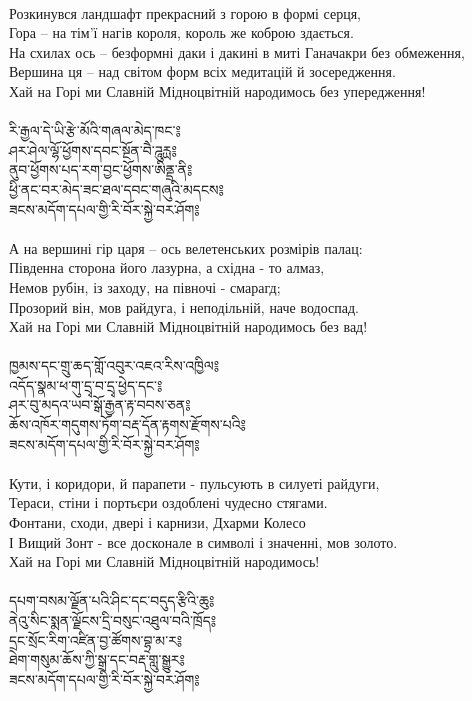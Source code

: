 \\
Розкинувся ландшафт прекрасний з горою в формі серця,\\
Гора -- на тім'ї нагів короля, король же коброю здається.\\
На схилах ось -- безформні даки і дакині в миті Ганачакри без обмеження, \\
Вершина ця -- над світом форм всіх медитацій й зосередження.\\
Хай на Горі ми Славній Мідноцвітній народимось без упередження! \\
\\
{\ti རི་རྒྱལ་དེ་ཡི་རྩེ་མོའི་གཞལ་མེད་ཁང་༔\\
ཤར་ཤེལ་ལྷོ་ཕྱོགས་དབང་སྔོན་བཻ་ཌཱུརྻ༔\\
ནུབ་ཕྱོགས་པད་རག་བྱང་ཕྱོགས་ཨིནྡྲ་ནི༔\\
ཕྱི་ནང་བར་མེད་ཟང་ཐལ་དབང་གཞུའི་མདངས༔\\
ཟངས་མདོག་དཔལ་གྱི་རི་བོར་སྐྱེ་བར་ཤོག༔}\\
\\
А на вершині гір царя -- ось велетенських розмірів палац:\\
Південна сторона його лазурна, а східна - то алмаз,\\
Немов рубін, із заходу, на півночі - смарагд;\\
Прозорий він, мов райдуга, і неподільній,  наче водоспад.\\
Хай на Горі ми Славній Мідноцвітній народимось без вад!\\
\\
{\ti ཁྱམས་དང་གྲུ་ཆད་གློ་འབུར་འཇའ་རིས་འཁྱིལ༔\\
འདོད་སྣམ་ཕ་གུ་དྲྭ་བ་དྲྭ་ཕྱེད་དང་༔\\
ཤར་བུ་མདའ་ཡབ་སྒོ་རྒྱན་རྟ་བབས་ཅན༔\\
ཆོས་འཁོར་གདུགས་ཏོག་བརྡ་དོན་རྟགས་རྫོགས་པའི༔\\
ཟངས་མདོག་དཔལ་གྱི་རི་བོར་སྐྱེ་བར་ཤོག༔}\\
\\
Кути, і коридори, й парапети - пульсують в силуеті райдуги,  \\
Тераси, стіни і портьєри оздоблені чудесно стягами.\\
Фонтани, сходи, двері і карнизи, Дхарми Колесо \\
І Вищий Зонт - все досконале в символі і значенні, мов золото.\\
Хай на Горі ми Славній Мідноцвітній народимось!\\
\\
{\ti དཔག་བསམ་ལྗོན་པའི་ཤིང་དང་བདུད་རྩིའི་ཆུ༔\\
ནེའུ་སིང་སྨན་ལྗོངས་དྲི་བསུང་འཐུལ་བའི་ཁྲོད༔\\
དྲང་སྲོང་རིག་འཛིན་བྱ་ཚོགས་བྷྲ་མ་ར༔\\
ཐེག་གསུམ་ཆོས་ཀྱི་སྒྲ་དང་བརྡ་གླུ་སྒྱུར༔\\
ཟངས་མདོག་དཔལ་གྱི་རི་བོར་སྐྱེ་བར་ཤོག༔}\\
